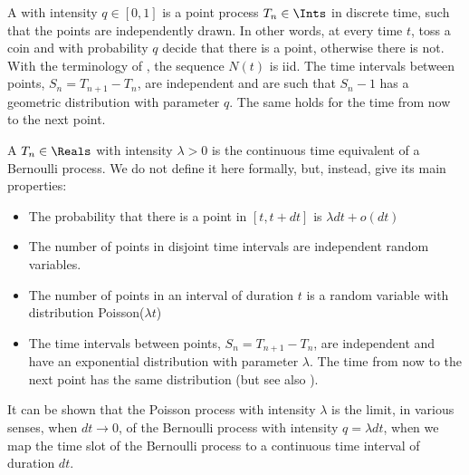 A  with intensity $q\in [0,1]$ is a point
process $T_n\in \Ints$ in discrete time, such that the points
are independently drawn. In other words, at every time $t$,
toss a coin and with probability $q$ decide that there is a
point, otherwise there is not. With the terminology of
, the sequence $N(t)$ is iid. The time intervals
between points, $S_n=T_{n+ 1}-T_n$, are independent and are
such that $S_n-1$ has a geometric distribution with parameter
$q$. The same holds for the time from now to the next point.

A  $T_n\in \Reals$  with intensity
$\lambda>0$ is the continuous time equivalent of a Bernoulli
process. We do not define it here formally, but, instead, give
its main properties:
\begin{itemize}
  \item The probability that there is a point in $[t, t+
      dt]$ is $\lambda dt + o(dt)$
  \item The number of points in disjoint time intervals are
      independent random variables.
  \item The number of points in an interval of duration $t$
      is a random variable with distribution
      Poisson($\lambda t$)
  \item The time intervals between points, $S_n=T_{n+
      1}-T_n$, are independent and have an exponential
      distribution with parameter $\lambda$. The time from
      now to the next point has the same distribution (but
      see also ).
\end{itemize}

 It can be shown that the Poisson process with intensity $\lambda$ is the limit, in
 various  senses, when $dt \to 0$, of the Bernoulli process with
 intensity $q = \lambda dt$, when we map the time slot of
 the Bernoulli process to a continuous time interval of
 duration $dt$.



